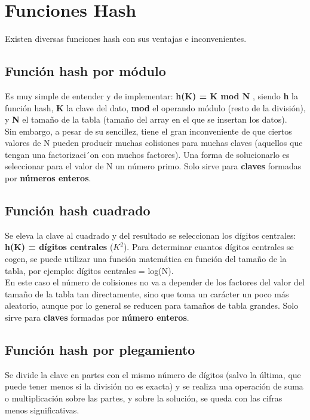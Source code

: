 \documentclass{article}
\begin{document}
\newpage

\section{Funciones Hash}
Existen diversas funciones hash con sus ventajas e inconvenientes.

\subsection{Función hash por módulo}
Es muy simple de entender y de implementar: \textbf{h(K) = K mod N} , siendo \textbf{h} la función hash, \textbf{K} la clave del dato, \textbf{mod} el operando módulo (resto de la división), y \textbf{N} el tamaño de la tabla (tamaño del array en el que se insertan los datos). \\

Sin embargo, a pesar de su sencillez, tiene el gran inconveniente de que ciertos valores de N
pueden producir muchas colisiones para muchas claves (aquellos que tengan una factorizaci´on
con muchos factores). Una forma de solucionarlo es seleccionar para el valor de N un número primo. Solo sirve para \textbf{claves} formadas por \textbf{números enteros}.\\

\subsection{Función hash cuadrado}
Se eleva la clave al cuadrado y del resultado se seleccionan los dígitos centrales: \textbf{h(K) =
dígitos centrales} ($K^2$). Para determinar cuantos dígitos centrales se cogen, se puede utilizar
una función matemática en función del tamaño de la tabla, por ejemplo: dígitos centrales =
log(N). \\

En este caso el número de colisiones no va a depender de los factores del valor del tamaño
de la tabla tan directamente, sino que toma un carácter un poco más aleatorio, aunque por lo
general se reducen para tamaños de tabla grandes. Solo sirve para \textbf{claves} formadas por \textbf{número enteros}.\\

\subsection{Función hash por plegamiento}
Se divide la clave en partes con el mismo número de dígitos (salvo la última, que puede tener
menos si la división no es exacta) y se realiza una operación de suma o multiplicación sobre las partes, y sobre la solución, se queda con las cifras menos significativas. \\
\end{document}
